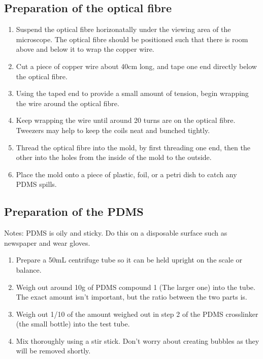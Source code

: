 \documentclass[10pt, journal]{IEEEtran}
\begin{document}
\subsection{Preparation of the optical fibre}
\begin{enumerate}
\item Suspend the optical fibre horizonatally under the viewing area
  of the microscope. The optical fibre should be positioned such
  that there is room above and below it to wrap the copper wire.

\item Cut a piece of copper wire about 40cm long, and tape one end
  directly below the optical fibre.

\item Using the taped end to provide a small amount of tension, begin
  wrapping the wire around the optical fibre.

\item Keep wrapping the wire until around 20 turns are on the optical
  fibre. Tweezers may help to keep the coils neat and bunched tightly.

\item Thread the optical fibre into the mold, by first threading one
  end, then the other into the holes from the inside of the mold to
  the outside.

\item Place the mold onto a piece of plastic, foil, or a petri dish to
  catch any PDMS spills.
      
\end{enumerate}

\subsection{Preparation of the PDMS}
Notes: PDMS is oily and sticky. Do this on a disposable surface such
as newspaper and wear gloves.

\begin{enumerate}
\item Prepare a 50mL centrifuge tube so it can be held upright on the scale or balance.
\item Weigh out around 10g of PDMS compound 1 (The larger one) into the tube. The exact amount isn't important, but the ratio between the two parts is.
\item Weigh out 1/10 of the amount weighed out in step 2 of the PDMS
  crosslinker (the small bottle) into the test tube.
\item Mix thoroughly using a stir stick. Don't worry about creating bubbles as they will be removed shortly.
\end{enumerate}
\end{document}
